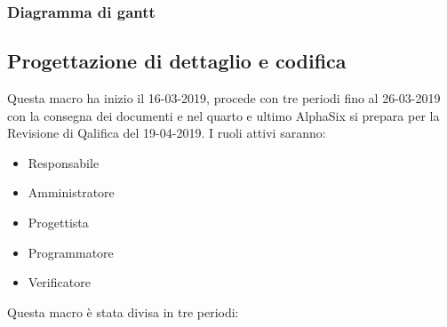             \subsubsection{Diagramma di gantt}

        \subsection{Progettazione di dettaglio e codifica}
        Questa macro ha inizio il 16-03-2019, procede con tre periodi fino al 26-03-2019 con la consegna dei documenti e nel
        quarto e ultimo AlphaSix si prepara per la Revisione di Qalifica del 19-04-2019. I ruoli attivi saranno: 
        \begin{itemize}
            \item Responsabile
            \item Amministratore
            \item Progettista
            \item Programmatore
            \item Verificatore
        \end{itemize}
        Questa macro è stata divisa in tre periodi:
